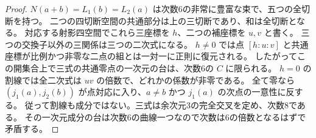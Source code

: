 \begin{proof}
$N(a+b)=L_1(b)=L_2(a)$ は次数6の非常に豊富な束で、五つの全切断を持つ。
二つの四切断空間の共通部分は上の三切断であり、和は全切断となる。
対応する射影四空間でこれら三座標を $h$、二つの補座標を $u,v$ と書く。
三つの交換子以外の三関係は三つの二次式になる。
$h\ne0$ では点 $[h:u:v]$ と共通座標が比例かつ非零な二点の組とは一対一に正則に復元される。
したがってこの開集合上で三式の共通零点の一次元の台は、次数6の $C$ に限られる。
$h=0$ の割線では全二次式は $uv$ の倍数で、どれかの係数が非零である。
全て零なら $(j_1(a),j_2(b))$ が点対応に入り、$a\ne b$ かつ $j_1(a)$ の次点の一意性に反する。
従って割線も成分ではない。三式は余次元3の完全交叉を定め、次数8である。
その一次元成分の台は次数6の曲線一つなので次数は6の倍数となるはずで矛盾する。
\end{proof}
